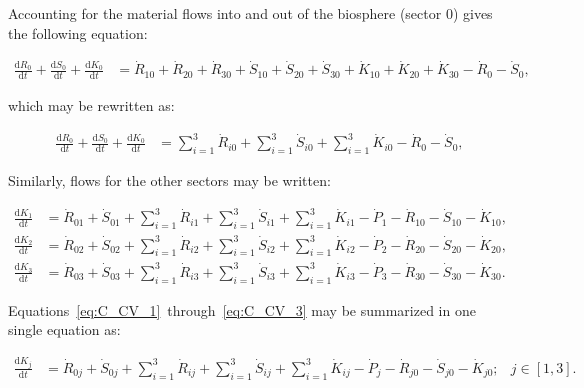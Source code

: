 Accounting for the material flows into and out of the biosphere (sector 0) gives the following equation:

\begin{align} \label{eq:C_CV_0}
	\frac{\mathrm{d}R_{0}}{\mathrm{d}t} 
	+ \frac{\mathrm{d}S_{0}}{\mathrm{d}t}	
	+ \frac{\mathrm{d}K_0}{\mathrm{d}t}		
	& =  \dot{R}_{10} + \dot{R}_{20} + \dot{R}_{30}
	+ \dot{S}_{10} + \dot{S}_{20} + \dot{S}_{30}
	+ \dot{K}_{10} + \dot{K}_{20} + \dot{K}_{30}
	- \dot{R}_{0} 
	- \dot{S}_{0},
\end{align}

\noindent which may be rewritten as:

\begin{align} \label{eq:C_CV_0_b}
	\frac{\mathrm{d}R_{0}}{\mathrm{d}t} 
	+ \frac{\mathrm{d}S_{0}}{\mathrm{d}t}	
	+ \frac{\mathrm{d}K_0}{\mathrm{d}t}		
	& =  \sum_{i = 1}^{3}\dot{R}_{i0}
	+ \sum_{i = 1}^{3}\dot{S}_{i0}
	+ \sum_{i = 1}^{3}\dot{K}_{i0}
	- \dot{R}_{0} 
	- \dot{S}_{0},
\end{align}

Similarly, flows for the other sectors may be written:

\begin{align} \label{eq:C_CV_1}
	\frac{\mathrm{d}K_{1}}{\mathrm{d}t}		
	& =  \dot{R}_{01} 
	+ \dot{S}_{01}
	+ \sum_{i = 1}^{3}\dot{R}_{i1}
	+ \sum_{i = 1}^{3}\dot{S}_{i1}
	+ \sum_{i = 1}^{3}\dot{K}_{i1}
	- \dot{P}_{1}
	- \dot{R}_{10} 
	- \dot{S}_{10}
	- \dot{K}_{10},										\\
	\label{eq:C_CV_2}
	\frac{\mathrm{d}K_{2}}{\mathrm{d}t}		
	& =  \dot{R}_{02} 
	+ \dot{S}_{02}
	+ \sum_{i = 1}^{3}\dot{R}_{i2}
	+ \sum_{i = 1}^{3}\dot{S}_{i2}
	+ \sum_{i = 1}^{3}\dot{K}_{i2}
	- \dot{P}_{2}
	- \dot{R}_{20} 
	- \dot{S}_{20}
	- \dot{K}_{20},										\\	
	\label{eq:C_CV_3}
	\frac{\mathrm{d}K_{3}}{\mathrm{d}t}		
	& =  \dot{R}_{03} 
	+ \dot{S}_{03}
	+ \sum_{i = 1}^{3}\dot{R}_{i3}
	+ \sum_{i = 1}^{3}\dot{S}_{i3}
	+ \sum_{i = 1}^{3}\dot{K}_{i3}
	- \dot{P}_{3}
	- \dot{R}_{30} 
	- \dot{S}_{30}
	- \dot{K}_{30}.										
\end{align}

Equations~\ref{eq:C_CV_1}~through~\ref{eq:C_CV_3} may be summarized
in one single equation as:

\begin{align} \label{eq:C_CV_1_to_3_b}
	\frac{\mathrm{d}K_{j}}{\mathrm{d}t}		
	& =  \dot{R}_{0j} 
	+ \dot{S}_{0j}
	+ \sum_{i = 1}^{3}\dot{R}_{ij}
	+ \sum_{i = 1}^{3}\dot{S}_{ij}
	+ \sum_{i = 1}^{3}\dot{K}_{ij}
	- \dot{P}_{j}
	- \dot{R}_{j0} 
	- \dot{S}_{j0}
	- \dot{K}_{j0};
	& j \in \left[1,3\right].
\end{align}

